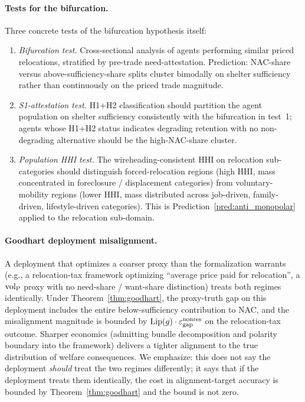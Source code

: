 \paragraph{Tests for the bifurcation.}
Three concrete tests of the bifurcation hypothesis itself:
\begin{enumerate}
\item \emph{Bifurcation test.}  Cross-sectional analysis of
  agents performing similar priced relocations, stratified
  by pre-trade need-attestation.  Prediction: NAC-share
  versus above-sufficiency-share splits cluster bimodally
  on shelter sufficiency rather than continuously on the
  priced trade magnitude.
\item \emph{S1-attestation test.}  H1+H2 classification
  should partition the agent population on shelter
  sufficiency consistently with the bifurcation in test~1;
  agents whose H1+H2 status indicates degrading retention
  with no non-degrading alternative should be the
  high-NAC-share cluster.
\item \emph{Population HHI test.}  The wireheading-consistent
  HHI on relocation sub-categories should distinguish
  forced-relocation regions (high HHI, mass concentrated
  in foreclosure / displacement categories) from
  voluntary-mobility regions (lower HHI, mass distributed
  across job-driven, family-driven, lifestyle-driven
  categories).  This is Prediction~\ref{pred:anti_monopolar}
  applied to the relocation sub-domain.
\end{enumerate}

\paragraph{Goodhart deployment misalignment.}
A deployment that optimizes a coarser proxy than the
formalization warrants (e.g., a relocation-tax framework
optimizing ``average price paid for relocation'', a ${\operatorname{vol}_{\mathrm{P}}}$
proxy with no need-share / want-share distinction) treats
both regimes identically.  Under Theorem~\ref{thm:goodhart},
the proxy-truth gap on this deployment includes the entire
below-sufficiency contribution to NAC, and the misalignment
magnitude is bounded by $\mathrm{Lip}(g) \cdot \varepsilon_{\mathrm{gap}}^{\mathrm{nonres}}$ on
the relocation-tax outcome.  Sharper economics (admitting
bundle decomposition and polarity boundary into the framework)
delivers a tighter alignment to the true distribution of
welfare consequences.  We emphasize: this does not say the
deployment \emph{should} treat the two regimes differently;
it says that if the deployment treats them identically, the
cost in alignment-target accuracy is bounded by
Theorem~\ref{thm:goodhart} and the bound is not zero.

